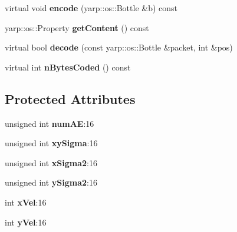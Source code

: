 \begin{DoxyCompactItemize}
\item 
virtual void {\bfseries encode} (yarp\+::os\+::\+Bottle \&b) const \hypertarget{classev_1_1ClusterEventGauss_aa54b0aba37f5a1f7aa3f77458b4d0843}{}\label{classev_1_1ClusterEventGauss_aa54b0aba37f5a1f7aa3f77458b4d0843}

\item 
yarp\+::os\+::\+Property {\bfseries get\+Content} () const \hypertarget{classev_1_1ClusterEventGauss_aa707d8caffd6d16d518791a3534249e3}{}\label{classev_1_1ClusterEventGauss_aa707d8caffd6d16d518791a3534249e3}

\item 
virtual bool {\bfseries decode} (const yarp\+::os\+::\+Bottle \&packet, int \&pos)\hypertarget{classev_1_1ClusterEventGauss_a7dc887813031611b707e5ace62bab222}{}\label{classev_1_1ClusterEventGauss_a7dc887813031611b707e5ace62bab222}

\item 
virtual int {\bfseries n\+Bytes\+Coded} () const \hypertarget{classev_1_1ClusterEventGauss_aee82fc72b8f35ec88df2e2ddab7a6674}{}\label{classev_1_1ClusterEventGauss_aee82fc72b8f35ec88df2e2ddab7a6674}

\end{DoxyCompactItemize}
\subsection*{Protected Attributes}
\begin{DoxyCompactItemize}
\item 
unsigned int {\bfseries num\+AE}\+:16\hypertarget{classev_1_1ClusterEventGauss_ad33637c7c7648f7f75a5687cb3dc9f10}{}\label{classev_1_1ClusterEventGauss_ad33637c7c7648f7f75a5687cb3dc9f10}

\item 
unsigned int {\bfseries xy\+Sigma}\+:16\hypertarget{classev_1_1ClusterEventGauss_adafdbc89273fdfac859451c96228c3d0}{}\label{classev_1_1ClusterEventGauss_adafdbc89273fdfac859451c96228c3d0}

\item 
unsigned int {\bfseries x\+Sigma2}\+:16\hypertarget{classev_1_1ClusterEventGauss_a949838037074552acbf68e79774e4d0d}{}\label{classev_1_1ClusterEventGauss_a949838037074552acbf68e79774e4d0d}

\item 
unsigned int {\bfseries y\+Sigma2}\+:16\hypertarget{classev_1_1ClusterEventGauss_ab59726c59d3504d60b9561392d4d3536}{}\label{classev_1_1ClusterEventGauss_ab59726c59d3504d60b9561392d4d3536}

\item 
int {\bfseries x\+Vel}\+:16\hypertarget{classev_1_1ClusterEventGauss_a1656c00217f8e7413da96fb63586c533}{}\label{classev_1_1ClusterEventGauss_a1656c00217f8e7413da96fb63586c533}

\item 
int {\bfseries y\+Vel}\+:16\hypertarget{classev_1_1ClusterEventGauss_a94890d974aad5dc36181e35a462ae997}{}\label{classev_1_1ClusterEventGauss_a94890d974aad5dc36181e35a462ae997}

\end{DoxyCompactItemize}


